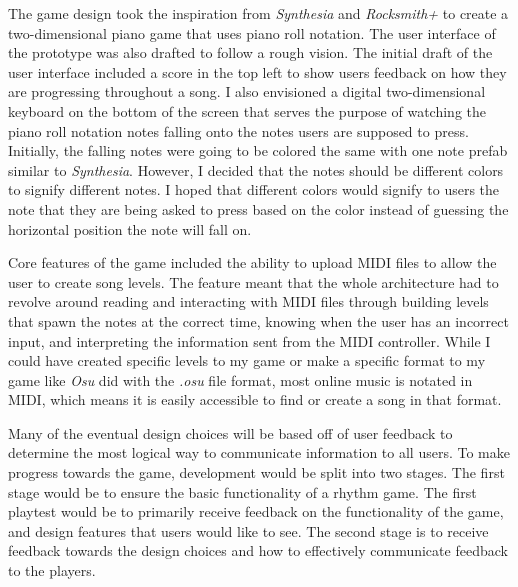 \documentclass[10pt,twocolumn]{article}
\begin{document}
The game design took the inspiration from \textit{Synthesia} and \textit{Rocksmith+} to create a two-dimensional piano game that uses piano roll notation. The user interface of the prototype was also drafted to follow a rough vision. The initial draft of the user interface included a score in the top left to show users feedback on how they are progressing throughout a song. I also envisioned a digital two-dimensional keyboard on the bottom of the screen that serves the purpose of watching the piano roll notation notes falling onto the notes users are supposed to press. Initially, the falling notes were going to be colored the same with one note prefab similar to \textit{Synthesia}. However, I decided that the notes should be different colors to signify different notes. I hoped that different colors would signify to users the note that they are being asked to press based on the color instead of guessing the horizontal position the note will fall on. 

Core features of the game included the ability to upload MIDI files to allow the user to create song levels. The feature meant that the whole architecture had to revolve around reading and interacting with MIDI files through building levels that spawn the notes at the correct time, knowing when the user has an incorrect input, and interpreting the information sent from the MIDI controller. While I could have created specific levels to my game or make a specific format to my game like \textit{Osu} did with the \textit{.osu} file format, most online music is notated in MIDI, which means it is easily accessible to find or create a song in that format. 

Many of the eventual design choices will be based off of user feedback to determine the most logical way to communicate information to all users. To make progress towards the game, development would be split into two stages. The first stage would be to ensure the basic functionality of a rhythm game. The first playtest would be to primarily receive feedback on the functionality of the game, and design features that users would like to see. The second stage is to receive feedback towards the design choices and how to effectively communicate feedback to the players. 
\end{document}
